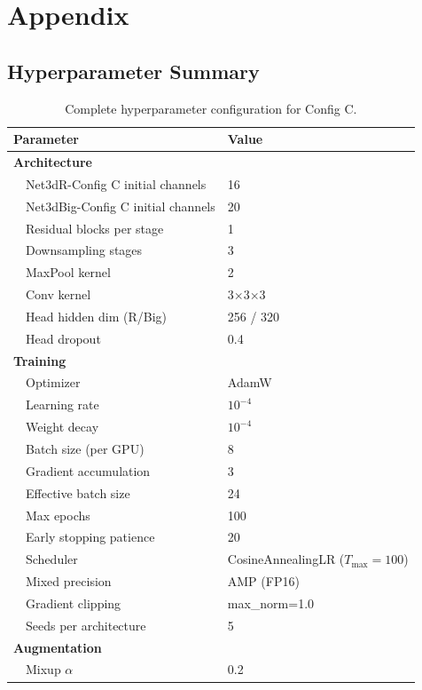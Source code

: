 \appendix
\section{Appendix}
\label{sec:appendix}

\subsection{Hyperparameter Summary}
\label{app:hyperparams}

\begin{table}[H]
\centering
\caption{Complete hyperparameter configuration for Config C.}
\label{tab:hyperparams}
\begin{tabular}{ll}
\toprule
\textbf{Parameter} & \textbf{Value} \\
\midrule
\textbf{Architecture} & \\
\ \ Net3dR-Config C initial channels & 16 \\
\ \ Net3dBig-Config C initial channels & 20 \\
\ \ Residual blocks per stage & 1 \\
\ \ Downsampling stages & 3 \\
\ \ MaxPool kernel & 2 \\
\ \ Conv kernel & 3$\times$3$\times$3 \\
\ \ Head hidden dim (R/Big) & 256 / 320 \\
\ \ Head dropout & 0.4 \\
\midrule
\textbf{Training} & \\
\ \ Optimizer & AdamW \\
\ \ Learning rate & $10^{-4}$ \\
\ \ Weight decay & $10^{-4}$ \\
\ \ Batch size (per GPU) & 8 \\
\ \ Gradient accumulation & 3 \\
\ \ Effective batch size & 24 \\
\ \ Max epochs & 100 \\
\ \ Early stopping patience & 20 \\
\ \ Scheduler & CosineAnnealingLR ($T_{\text{max}}=100$) \\
\ \ Mixed precision & AMP (FP16) \\
\ \ Gradient clipping & max\_norm=1.0 \\
\ \ Seeds per architecture & 5 \\
\midrule
\textbf{Augmentation} & \\
\ \ Mixup $\alpha$ & 0.2 \\

\end{tabular}
\end{table}
